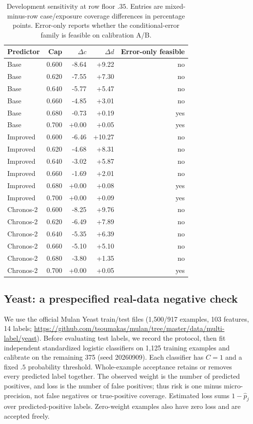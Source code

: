 \begin{table}[t]\centering\small
\caption{Development sensitivity at row floor $.35$. Entries are mixed-minus-row case/exposure coverage differences in percentage points. Error-only reports whether the conditional-error family is feasible on calibration A/B.}\label{tab:new-cap}
\begin{tabular}{lrrrr}\toprule
Predictor & Cap & $\Delta c$ & $\Delta d$ & Error-only feasible\\\midrule
Base & 0.600 & -8.64 & +9.22 & no\\
Base & 0.620 & -7.55 & +7.30 & no\\
Base & 0.640 & -5.77 & +5.47 & no\\
Base & 0.660 & -4.85 & +3.01 & no\\
Base & 0.680 & -0.73 & +0.19 & yes\\
Base & 0.700 & +0.00 & +0.05 & yes\\
Improved & 0.600 & -6.46 & +10.27 & no\\
Improved & 0.620 & -4.68 & +8.31 & no\\
Improved & 0.640 & -3.02 & +5.87 & no\\
Improved & 0.660 & -1.69 & +2.01 & no\\
Improved & 0.680 & +0.00 & +0.08 & yes\\
Improved & 0.700 & +0.00 & +0.09 & yes\\
Chronos-2 & 0.600 & -8.25 & +9.76 & no\\
Chronos-2 & 0.620 & -6.49 & +7.89 & no\\
Chronos-2 & 0.640 & -5.35 & +6.39 & no\\
Chronos-2 & 0.660 & -5.10 & +5.10 & no\\
Chronos-2 & 0.680 & -3.80 & +1.35 & no\\
Chronos-2 & 0.700 & +0.00 & +0.05 & yes\\
\bottomrule\end{tabular}\end{table}

\subsection{Yeast: a prespecified real-data negative check}
We use the official Mulan Yeast train/test files (1,500/917 examples, 103 features, 14 labels; \url{https://github.com/tsoumakas/mulan/tree/master/data/multi-label/yeast}). Before evaluating test labels, we record the protocol, then fit independent standardized logistic classifiers on 1,125 training examples and calibrate on the remaining 375 (seed 20260909). Each classifier has $C=1$ and a fixed $.5$ probability threshold. Whole-example acceptance retains or removes every predicted label together. The observed weight is the number of predicted positives, and loss is the number of false positives; thus risk is one minus micro-precision, not false negatives or true-positive coverage. Estimated loss sums $1-\hat p_j$ over predicted-positive labels. Zero-weight examples also have zero loss and are accepted freely.

